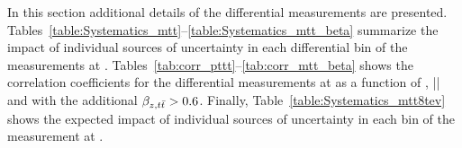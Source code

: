 In this section additional details of the differential measurements
are
presented. Tables~\ref{table:Systematics_mtt}--\ref{table:Systematics_mtt_beta}
summarize the impact of individual sources of uncertainty in each
differential bin of the measurements at
\seventev{}. Tables~\ref{tab:corr_pttt}--\ref{tab:corr_mtt_beta} shows
the correlation coefficients for the differential measurements at
\seventev{} as a function of \pttt{}, |\ytt{}| and \mtt{} with the
additional $\beta_{z,t\bar{t}}>0.6$. Finally, Table~\ref{table:Systematics_mtt8tev} shows
the expected impact of individual sources of uncertainty in each
\mtt{} bin of the measurement at \eighttev{}.

